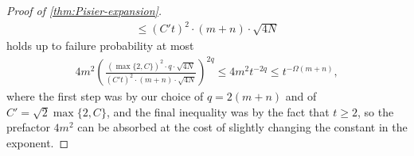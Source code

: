 \documentclass[aos]{imsart}
\theoremstyle{definition}
\numberwithin{equation}{section}
\DeclareMathOperator{\op}{op}
\DeclarePairedDelimiter{\norm}{\lVert}{\rVert}
\newcommand{\E}{\mathbb{E}}
\newcommand{\MW}[1]{{\color{red}[MW: #1]}}
\newcommand{\MW}[1]{{}}
\begin{document}
\begin{appendix}
\begin{proof} [Proof of \cref{thm:Pisier-expansion}]
\begin{align}
  \leq (C' t)^2 \cdot (m+n) \cdot \sqrt{4 N}
\end{align}
holds up to failure probability at most
\begin{align*}
  4 m^2 \left( \frac{(\max\{2, C\})^{2} \cdot q \cdot \sqrt{ 4 N } }{(C' t)^2 \cdot (m+n) \cdot \sqrt{4 N}} \right)^{2q}
  \leq 4 m^2 t^{-2q} \leq t^{-\Omega(m+n)} ,
\end{align*}
  where the first step was by our choice of $q = 2(m+n)$ and of $C' = \sqrt{2} \max\{2,C\}$, and the final inequality was by the fact that $t\geq2$, so the prefactor $4 m^{2}$ can be absorbed at the cost of slightly changing the constant in the exponent.

\end{proof}



\end{appendix}
\end{document}
